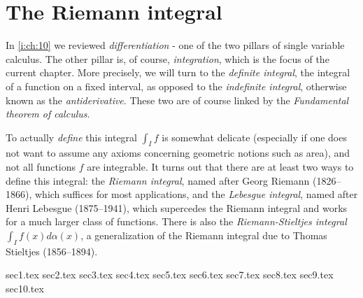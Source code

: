 \chapter{The Riemann integral}\label{i:ch:11}

\begin{note}
  In \cref{i:ch:10} we reviewed \emph{differentiation} - one of the two pillars of single variable calculus.
  The other pillar is, of course, \emph{integration}, which is the focus of the current chapter.
  More precisely, we will turn to the \emph{definite integral}, the integral of a function on a fixed interval, as opposed to the \emph{indefinite integral}, otherwise known as the \emph{antiderivative}.
  These two are of course linked by the \emph{Fundamental theorem of calculus}.
\end{note}

\begin{note}
  To actually \emph{define} this integral \(\int_I f\) is somewhat delicate (especially if one does not want to assume any axioms concerning geometric notions such as area), and not all functions \(f\) are integrable.
  It turns out that there are at least two ways to define this integral:
  the \emph{Riemann integral}, named after Georg Riemann (1826--1866), which suffices for most applications, and the \emph{Lebesgue integral}, named after Henri Lebesgue (1875--1941), which supercedes the Riemann integral and works for a much larger class of functions.
  There is also the \emph{Riemann-Stieltjes integral} \(\int_I f(x) d \alpha(x)\), a generalization of the Riemann integral due to Thomas Stieltjes (1856--1894).
\end{note}

{sec1.tex}
{sec2.tex}
{sec3.tex}
{sec4.tex}
{sec5.tex}
{sec6.tex}
{sec7.tex}
{sec8.tex}
{sec9.tex}
{sec10.tex}
